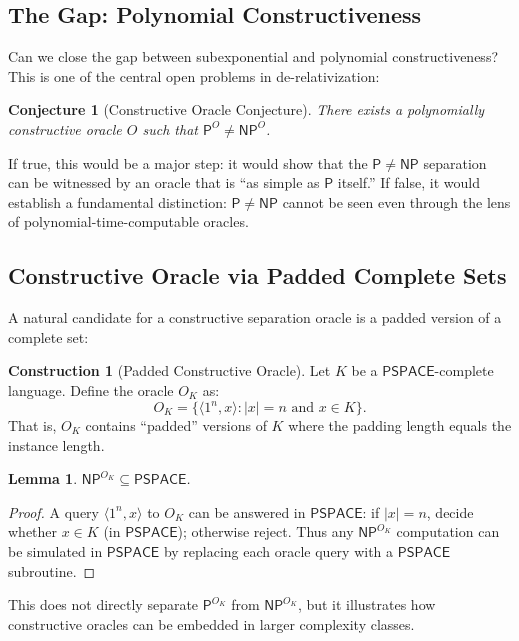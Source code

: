 \documentclass[11pt,a4paper]{article}
\theoremstyle{plain}
\newtheorem{lemma}[theorem]{Lemma}
\newtheorem{conjecture}[theorem]{Conjecture}
\theoremstyle{definition}
\newtheorem{construction}[theorem]{Construction}
\theoremstyle{remark}
\newcommand{\PP}{\mathsf{P}}
\newcommand{\NP}{\mathsf{NP}}
\newcommand{\PSPACE}{\mathsf{PSPACE}}
\newcommand{\enc}[1]{\langle #1 \rangle}
\begin{document}
\subsection{The Gap: Polynomial Constructiveness}

Can we close the gap between subexponential and polynomial constructiveness?
This is one of the central open problems in de-relativization:

\begin{conjecture}[Constructive Oracle Conjecture]
There exists a polynomially constructive oracle $O$ such that
$\PP^O \neq \NP^O$.
\end{conjecture}

If true, this would be a major step: it would show that the $\PP \neq \NP$
separation can be witnessed by an oracle that is ``as simple as $\PP$ itself.''
If false, it would establish a fundamental distinction: $\PP \neq \NP$ cannot be
seen even through the lens of polynomial-time-computable oracles.

\subsection{Constructive Oracle via Padded Complete Sets}

A natural candidate for a constructive separation oracle is a padded version of
a complete set:

\begin{construction}[Padded Constructive Oracle]
Let $K$ be a $\PSPACE$-complete language.  Define the oracle $O_K$ as:
\[
    O_K = \{ \enc{1^n, x} : |x| = n \text{ and } x \in K \}.
\]
That is, $O_K$ contains ``padded'' versions of $K$ where the padding length
equals the instance length.
\end{construction}

\begin{lemma}
$\NP^{O_K} \subseteq \PSPACE$.
\end{lemma}
\begin{proof}
A query $\enc{1^n, x}$ to $O_K$ can be answered in $\PSPACE$: if $|x| = n$,
decide whether $x \in K$ (in $\PSPACE$); otherwise reject.  Thus any $\NP^{O_K}$
computation can be simulated in $\PSPACE$ by replacing each oracle query with a
$\PSPACE$ subroutine.
\end{proof}

This does not directly separate $\PP^{O_K}$ from $\NP^{O_K}$, but it
illustrates how constructive oracles can be embedded in larger complexity
classes.
\end{document}
